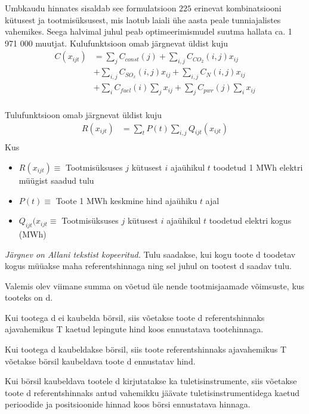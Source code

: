 \documentclass[twosided, 10pt, a4paper]{article}
\begin{document}
Umbkaudu hinnates sisaldab see formulatsioon $225$ erinevat kombinatsiooni k\"utusest ja  tootmis\"uksusest, mis laotub laiali \"uhe aasta peale tunniajalistes vahemikes. Seega halvimal juhul peab optimeerimismudel suutma hallata ca. 1 971 000 muutjat.
Kulufunktsioon omab j\"argnevat \"uldist kuju
\begin{align}
C(x_{ijt}) &= \sum_{j} C_{const}(j) + \sum_{i,j} C_{CO_2}(i,j)x_{ij} \nonumber \\
& + \sum_{i,j} C_{SO_x}(i,j)x_{ij} + \sum_{i,j} C_{N}(i,j)x_{ij} \nonumber \\
& + \sum_{i} C_{fuel}(i)\sum_j x_{ij} + \sum_{j} C_{pwr}(j)\sum_i x_{ij} \nonumber \\
\nonumber
\end{align}

Tulufunktsioon omab j\"argnevat \"uldist kuju
\begin{align}
R(x_{ijt}) &= \sum_{t}P(t)\sum_{i,j} Q_{ijt}(x_{ijt})\nonumber \\
\nonumber
\end{align}
Kus 
\begin{itemize}
\item[ ] $R(x_{ijt}) \equiv$ Tootmis\"uksuses $j$  k\"utusest $i$ aja\"uhikul $t$ toodetud 1 MWh elektri m\"u\"ugist saadud tulu
\item[ ] $P(t) \equiv$ Toote 1 MWh keskmine hind aja\"uhiku $t$ ajal
\item[ ] $Q_{ijt}(x_{ijt} \equiv$ Tootmis\"uksuses $j$  k\"utusest $i$ aja\"uhikul $t$ toodetud elektri kogus (MWh)
\end{itemize}

\emph{J\"argnev on Allani tekstist kopeeritud.}
Tulu saadakse, kui kogu toote d toodetav kogus m\"u\"uakse maha referentshinnaga ning sel juhul on tootest d saadav tulu.
 
Valemis olev viimane summa on v\~oetud \"ule nende tootmisjaamade v\~oimsuste, kus tooteks on d.
 
Kui tootega d ei kaubelda b\"orsil, siis v\~oetakse toote d referentshinnaks ajavahemikus T kaetud lepingute hind koos ennustatava tootehinnaga.
 
Kui tootega d kaubeldakse b\"orsil, siis toote referentshinnaks ajavahemikus T v\~oetakse b\"orsil kaubeldava toote d ennustatav hind.
 
Kui b\"orsil kaubeldava tootele d kirjutatakse ka tuletisinstrumente, siis v\~oetakse toote d referentshinnaks antud vahemikku jäävate tuletisinstrumentidega kaetud perioodide ja positsioonide hinnad koos b\"orsi ennustatava hinnaga.
 
\end{document}
